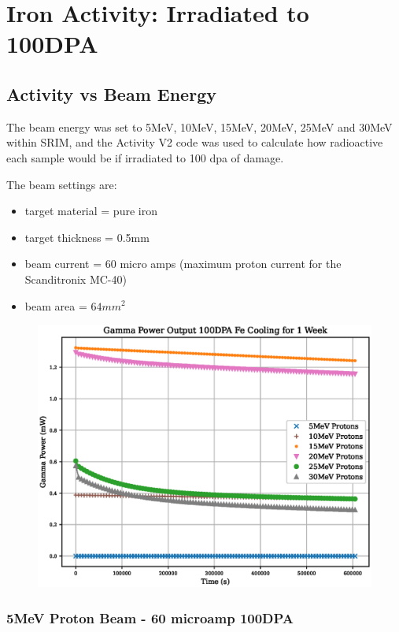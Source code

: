 \chapter{Iron Activity: Irradiated to 100DPA}
\label{chap:appendixironactivity}

\section{Activity vs Beam Energy}

The beam energy was set to 5MeV, 10MeV, 15MeV, 20MeV, 25MeV and 30MeV within SRIM, and the Activity V2 code was used to calculate how radioactive each sample would be if irradiated to 100 \acrshort{dpa} of damage.

The beam settings are:

\begin{itemize}
\item target material = pure iron
\item target thickness = 0.5mm
\item beam current = 60 micro amps (maximum proton current for the Scanditronix MC-40)
\item beam area = $64mm^2$
\end{itemize}



\begin{figure}[!htb]
\centering
\includegraphics[width=0.7\linewidth]{chapters/results_activity_code/fe_100dpa/cooling.eps}
\caption{}
\label{fig:100dpa-cooling}
\end{figure}



\clearpage
\FloatBarrier
\subsection{5MeV Proton Beam - 60 microamp 100DPA}


